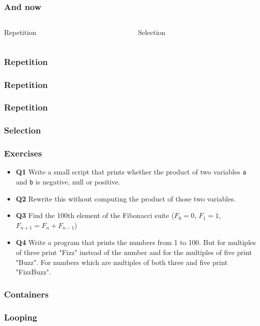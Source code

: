 \documentclass[xcolor=dvipsnames]{beamer}
\begin{document}
\begin{frame}
\frametitle{And now}
\begin{columns}

\begin{column}{0.5\textwidth}
\begin{block}{Repetition}
\end{block}
\end{column}

\begin{column}{0.5\textwidth}
\begin{block}{Selection}
\end{block}
\end{column}
\end{columns}
\end{frame}

\begin{frame}
\frametitle{Repetition}

\end{frame}

\begin{frame}
\frametitle{Repetition}

\end{frame}

\begin{frame}
\frametitle{Repetition}

\end{frame}

\begin{frame}
\frametitle{Selection}

\end{frame}

\begin{frame}
\frametitle{Exercises}
\begin{itemize}
\item \textbf{Q1} Write a small script that prints whether the product of two
variables \texttt{a} and \texttt{b} is negative, null or positive.
\item \textbf{Q2} Rewrite this without computing the
product of those two variables.
\item \textbf{Q3} Find the 100th element of the Fibonacci suite ($F_0 = 0$,
$F_1 = 1$, $F_{n + 1} = F_n + F_{n - 1}$)
\item \textbf{Q4} 
Write a program that prints the numbers from 1 to 100. But for multiples of
three print "Fizz" instead of the number and for the multiples of five print
"Buzz". For numbers which are multiples of both three and five print
"FizzBuzz".
\end{itemize}
\end{frame}

\begin{frame}
\frametitle{Containers}

\end{frame}

\begin{frame}
\frametitle{Looping}
\end{frame}
\end{document}
